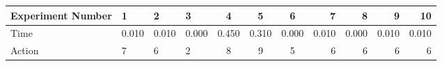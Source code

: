\documentclass[8pt]{article}
\begin{document}
\begin{landscape}
\begin{tabular}{ | l | l | l | l | c | c | c | r | r | r | r | }
 \hline 
Experiment Number & 1 & 2 & 3 & 4 & 5 & 6 & 7 & 8 & 9 & 10\\ \hline
Time & 0.010 & 0.010 & 0.000 & 0.450 & 0.310 & 0.000 & 0.010 & 0.000 & 0.010 & 0.010\\ \hline
Action & 7 & 6 & 2 & 8 & 9 & 5 & 6 & 6 & 6 & 6\\ \hline\end{tabular}
\end{landscape}
\end{document}
